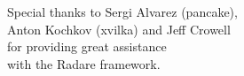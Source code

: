 \vspace*{7cm}
\begin{center}
Special thanks to Sergi Alvarez (pancake),\\
Anton Kochkov (xvilka) and Jeff Crowell\\
for providing great assistance\\
with the Radare framework.
\end{center}
